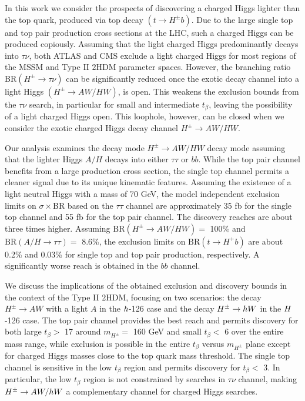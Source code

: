 In this work we consider the prospects of discovering a charged Higgs lighter than the top quark, produced via top decay $(t \rightarrow H^{\pm} b)$. Due to the large single top and top pair production cross sections at the LHC, such a charged Higgs can be produced copiously. Assuming that the light charged Higgs predominantly decays into $\tau\nu$, both ATLAS and CMS exclude a light charged Higgs for most regions of the MSSM and Type II $2$HDM parameter spaces. However, the branching ratio BR$(H^{\pm} \rightarrow \tau\nu)$ can be significantly reduced once the exotic decay channel into a light Higgs $(H^{\pm} \rightarrow AW/HW)$, is open. This weakens the exclusion bounds from the $\tau\nu$ search, in particular for small and intermediate $t_{\beta}$, leaving the possibility of a light charged Higgs open. This loophole, however, can be closed when we consider the exotic charged Higgs decay channel $H^\pm \to AW/HW$.

Our analysis examines the decay mode $H^{\pm} \rightarrow AW/HW$ decay mode assuming that the lighter Higgs $A/H$ decays into either $\tau\tau$ or $bb$. While the top pair channel benefits from a large production cross section, the single top channel permits a cleaner signal due to its unique kinematic features. Assuming the existence of a light neutral Higgs with a mass of 70 GeV, the model independent exclusion limits on $\sigma\times$BR based on the $\tau\tau$ channel are approximately 35 fb for the single top channel and 55 fb for the top pair channel. The discovery reaches are about three times higher. Assuming $\text{BR}(H^{\pm} \rightarrow AW/HW)=$ 100\% and $\text{BR}(A/H \rightarrow \tau\tau)=$ 8.6\%, the exclusion limits on $\text{BR}(t \rightarrow H^+ b)$ are about 0.2\% and 0.03\% for single top and top pair production, respectively. A significantly worse reach is obtained in the $bb$ channel. 

We discuss the implications of the obtained exclusion and discovery bounds in the context of the Type II $2$HDM, focusing on two scenarios: the decay $H^{\pm} \rightarrow AW$ with a light $A$ in the $h$-126 case and the decay $H^{\pm} \rightarrow h W$ in the $H$-126 case.  The top pair channel provides the best reach and permits discovery for both large $t_{\beta}>$ 17 around $m_{H^{\pm}}=$ 160 GeV and small $t_{\beta}<$ 6 over the entire mass range, while exclusion is possible in the entire $t_{\beta}$ versus $m_{H^{\pm}}$ plane except for charged Higgs masses close to the top quark mass threshold. The single top channel is sensitive in the low $t_{\beta}$ region and permits discovery for $t_{\beta}<$ 3. In particular, the low $t_{\beta}$ region is not constrained by searches in $\tau\nu$ channel, making $H^{\pm} \rightarrow AW/h W$ a complementary channel for charged Higgs searches.

